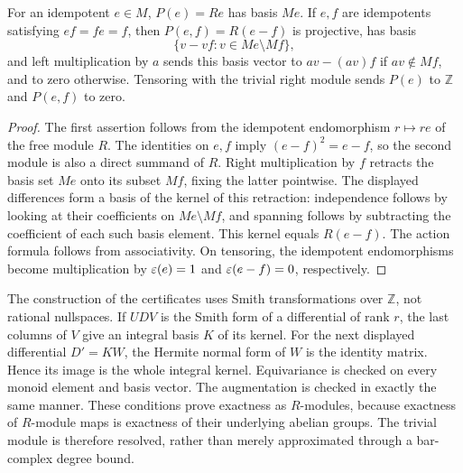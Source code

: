 \begin{lemma}\label{lem:B-projective-bases}
For an idempotent $e\in M$, $P(e)=Re$ has basis $Me$.  If $e,f$ are
idempotents satisfying $ef=fe=f$, then $P(e,f)=R(e-f)$ is projective,
has basis
\[
 \{v-vf:v\in Me\setminus Mf\},
\]
and left multiplication by $a$ sends this basis vector to
$av-(av)f$ if $av\notin Mf$, and to zero otherwise.  Tensoring with
the trivial right module sends $P(e)$ to $\mathbb Z$ and $P(e,f)$ to zero.
\end{lemma}
\begin{proof}
The first assertion follows from the idempotent endomorphism $r\mapsto re$
of the free module $R$.  The identities on $e,f$ imply
$(e-f)^2=e-f$, so the second module is also a direct summand of $R$.
Right multiplication by $f$ retracts the basis set $Me$ onto its subset
$Mf$, fixing the latter pointwise.  The displayed differences form a
basis of the kernel of this retraction: independence follows by looking
at their coefficients on $Me\setminus Mf$, and spanning follows by
subtracting the coefficient of each such basis element.  This kernel
equals $R(e-f)$.  The action formula follows from associativity.
On tensoring, the idempotent endomorphisms become multiplication by
$\varepsilon(e)=1$ and $\varepsilon(e-f)=0$, respectively.
\end{proof}

The construction of the certificates uses Smith transformations over
$\mathbb Z$, not rational nullspaces.  If $UDV$ is the Smith form of a
differential of rank $r$, the last columns of $V$ give an integral basis
$K$ of its kernel.  For the next displayed differential $D'=KW$,
the Hermite normal form of $W$ is the identity matrix.  Hence its image
is the whole integral kernel.  Equivariance is checked on every monoid
element and basis vector.  The augmentation is checked in exactly the
same manner.  These conditions prove exactness as $R$-modules, because
exactness of $R$-module maps is exactness of their underlying abelian
groups.  The trivial module is therefore resolved, rather than merely
approximated through a bar-complex degree bound.

